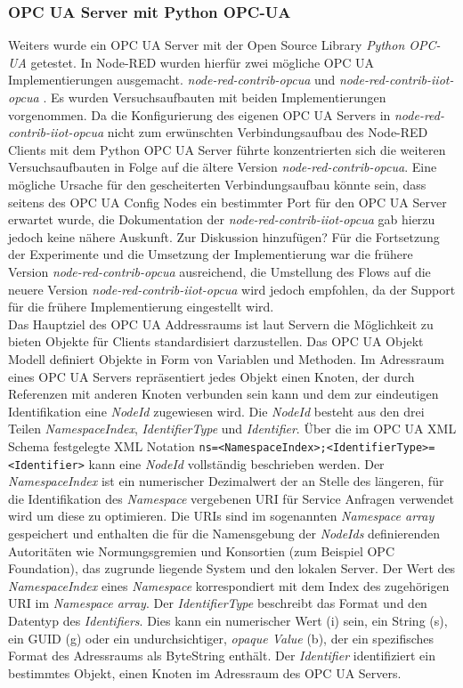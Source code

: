 \documentclass[BMR,Bachelor,ngerman]{twbook}%
\begin{document}
\subsubsection{OPC UA Server mit Python OPC-UA}
Weiters wurde ein OPC UA Server mit der Open Source Library \emph{Python OPC-UA} \cite{pythonopcua2018} getestet. In Node-RED wurden hierfür zwei mögliche \ac{OPC UA} Implementierungen ausgemacht. \emph{node-red-contrib-opcua} \cite{node-red-opcua} und \emph{node-red-contrib-iiot-opcua} \cite{node-red-iiot-opcua}. Es wurden Versuchsaufbauten mit beiden Implementierungen vorgenommen. Da die Konfigurierung des eigenen \ac{OPC UA} Servers in \emph{node-red-contrib-iiot-opcua} nicht zum erwünschten Verbindungsaufbau des Node-RED Clients mit dem Python OPC UA Server führte konzentrierten sich die weiteren Versuchsaufbauten in Folge auf die ältere Version \emph{node-red-contrib-opcua}. Eine mögliche Ursache für den gescheiterten Verbindungsaufbau könnte sein, dass seitens des OPC UA Config Nodes ein bestimmter Port für den OPC UA Server erwartet wurde, die Dokumentation der \emph{node-red-contrib-iiot-opcua} gab hierzu jedoch keine nähere Auskunft. {\color{purple}Zur Diskussion hinzufügen? Für die Fortsetzung der Experimente und die Umsetzung der Implementierung war die frühere Version \emph{node-red-contrib-opcua} ausreichend, die Umstellung des Flows auf die neuere Version \emph{node-red-contrib-iiot-opcua} wird jedoch empfohlen, da der Support für die frühere Implementierung eingestellt wird.}
%
\\\newline Das Hauptziel des OPC UA Addressraums ist laut  Servern die Möglichkeit zu bieten Objekte für Clients standardisiert darzustellen. Das OPC UA Objekt Modell definiert Objekte in Form von Variablen und Methoden. Im Adressraum eines \ac{OPC UA} Servers repräsentiert jedes Objekt einen Knoten, der durch Referenzen mit anderen Knoten verbunden sein kann und dem zur eindeutigen Identifikation eine \emph{NodeId} zugewiesen wird. Die \emph{NodeId} besteht aus den drei Teilen \emph{NamespaceIndex}, \emph{IdentifierType} und \emph{Identifier}. Über die im \ac{OPC UA} \ac{XML} Schema festgelegte \ac{XML} Notation \verb+ns=<NamespaceIndex>;<IdentifierType>=<Identifier>+ kann eine \emph{NodeId} vollständig beschrieben werden. Der \emph{NamespaceIndex} ist ein numerischer Dezimalwert der an Stelle des längeren, für die Identifikation des \emph{Namespace} vergebenen \ac{URI} für Service Anfragen verwendet wird um diese zu optimieren. Die \acp{URI} sind im sogenannten \emph{Namespace array} gespeichert und enthalten die für die Namensgebung der \emph{NodeIds} definierenden Autoritäten wie Normungsgremien und Konsortien (zum Beispiel OPC Foundation), das zugrunde liegende System und den lokalen Server. Der Wert des \emph{NamespaceIndex} eines \emph{Namespace} korrespondiert mit dem Index des zugehörigen \ac{URI} im  \emph{Namespace array}. Der \emph{IdentifierType} beschreibt das Format und den Datentyp des \emph{Identifiers}. Dies kann ein numerischer Wert (i) sein, ein String (s), ein \ac{GUID} (g) oder ein undurchsichtiger, \emph{opaque Value} (b), der ein spezifisches Format des Adressraums als ByteString enthält. Der \emph{Identifier} identifiziert ein bestimmtes Objekt, einen Knoten im Adressraum des \ac{OPC UA} Servers.
\end{document}

